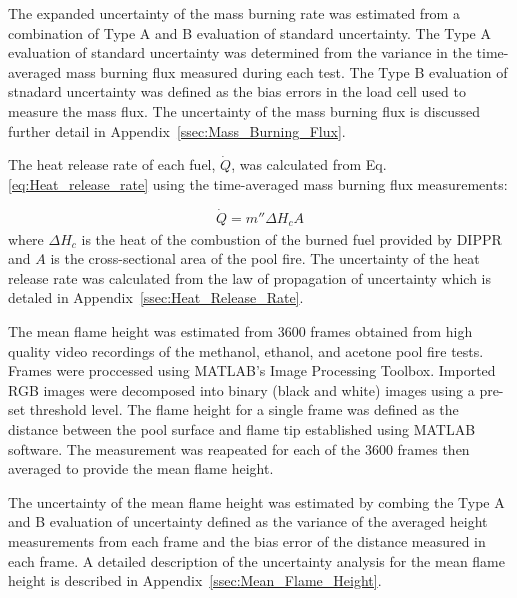 \documentclass[12pt]{article}
\begin{document}
The expanded uncertainty of the mass burning rate was estimated from a combination of Type A and B evaluation of standard uncertainty. The Type A evaluation of standard uncertainty was determined from the variance in the time-averaged mass burning flux measured during each test. The Type B evaluation of stnadard uncertainty was defined as the bias errors in the load cell used to measure the mass flux. The uncertainty of the mass burning flux is discussed further detail in Appendix~\ref{ssec:Mass_Burning_Flux}.

The heat release rate of each fuel, $\dot{Q}$, was calculated from Eq.\ref{eq:Heat_release_rate} using the time-averaged mass burning flux measurements:

\begin{equation}\label{eq:Heat_release_rate}
\dot{Q}= m''\Delta H_{c}A
\end{equation}
where $\Delta H_{c}$ is the heat of the combustion of the burned fuel provided by DIPPR\textsuperscript{\textregistered} and $A$ is the cross-sectional area of the pool fire. The uncertainty of the heat release rate was calculated from the law of propagation of uncertainty which is detaled in Appendix~\ref{ssec:Heat_Release_Rate}.

The mean flame height was estimated from 3600 frames obtained from high quality video recordings of the methanol, ethanol, and acetone pool fire tests. Frames were proccessed using MATLAB’s Image Processing Toolbox. Imported RGB images were decomposed into binary (black and white) images using a pre-set threshold level. The flame height for a single frame was defined as the distance between the pool surface and flame tip established using MATLAB software. The measurement was reapeated for each of the 3600 frames then averaged to provide the mean flame height. 

The uncertainty of the mean flame height was estimated by combing the Type A and B evaluation of uncertainty defined as the variance of the averaged height measurements from each frame and the bias error of the distance measured in each frame. A detailed description of the uncertainty analysis for the mean flame height is described in Appendix~\ref{ssec:Mean_Flame_Height}.
\end{document}
